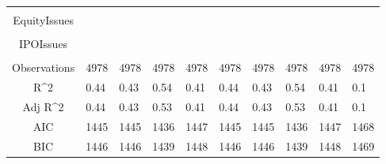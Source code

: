 \documentclass{article}
\begin{document}
\begin{table}[H]
\begin{tabular}{|clllllllll|}
   &  &  &  &  &  &  &  &  &  \\ 
  EquityIssues &  &  &  &  &  &  &  &  &  \\ 
   &  &  &  &  &  &  &  &  &  \\ 
  IPOIssues &  &  &  &  &  &  &  &  &  \\ 
   &  &  &  &  &  &  &  &  &  \\ 
  \hline 
 Observations & 4978 & 4978 & 4978 & 4978 & 4978 & 4978 & 4978 & 4978 & 4978 \\ 
  R^2 & 0.44 & 0.43 & 0.54 & 0.41 & 0.44 & 0.43 & 0.54 & 0.41 & 0.1 \\ 
  Adj R^2 & 0.44 & 0.43 & 0.53 & 0.41 & 0.44 & 0.43 & 0.53 & 0.41 & 0.1 \\ 
  AIC & 1445 & 1445 & 1436 & 1447 & 1445 & 1445 & 1436 & 1447 & 1468 \\ 
  BIC & 1446 & 1446 & 1439 & 1448 & 1446 & 1446 & 1439 & 1448 & 1469 \\ 
   \hline
\end{tabular}
 
\end{table}
\end{document}
